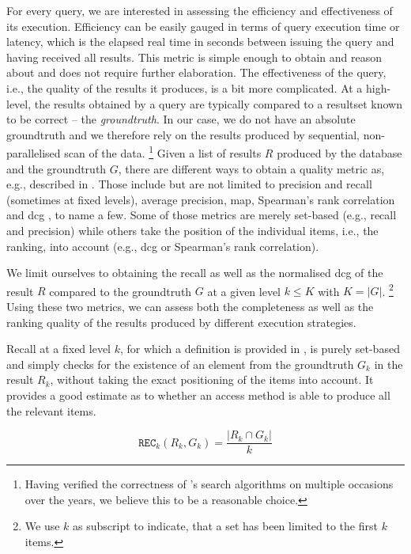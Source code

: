 For every query, we are interested in assessing the efficiency and effectiveness of its execution. Efficiency can be easily gauged in terms of query execution time or latency, which is the elapsed real time in seconds between issuing the query and having received all results. This metric is simple enough to obtain and reason about and does not require further elaboration. The effectiveness of the query, i.e., the quality of the results it produces, is a bit more complicated. At a high-level, the results obtained by a query are typically compared to a resultset known to be correct -- the \emph{groundtruth}. In our case, we do not have an absolute groundtruth and we therefore rely on the results produced by sequential, non-parallelised scan of the data. \footnote{Having verified the correctness of \cottontail{}'s search algorithms on multiple occasions over the years, we believe this to be a reasonable choice.} Given a list of results $R$ produced by the database and the groundtruth $G$, there are different ways to obtain a quality metric as, e.g., described in \cite{Webber:2010Similarity}. Those include but are not limited to precision and recall (sometimes at fixed levels), average precision, \acrfull{map}, Spearman's rank correlation and \acrfull{dcg} \cite{Jarvelin:2002Cumulated}, to name a few. Some of those metrics are merely set-based (e.g., recall and precision) while others take the position of the individual items, i.e., the ranking, into account (e.g., \acrshort{dcg} or Spearman's rank correlation).

We limit ourselves to obtaining the recall as well as the normalised \acrshort{dcg} \cite{Jarvelin:2002Cumulated} of the result $R$ compared to the groundtruth $G$ at a given level $k \leq K$ with $K = |G|$. \footnote{We use $k$ as subscript to indicate, that a set has been limited to the first $k$ items.} Using these two metrics, we can assess both the completeness as well as the ranking quality of the results produced by different execution strategies.

Recall at a fixed level $k$, for which a definition is provided in , is purely set-based and simply checks for the existence of an element from the groundtruth $G_k$ in the result $R_k$, without taking the exact positioning of the items into account. It provides a good estimate as to whether an access method is able to produce all the relevant items.

\begin{equation}
    \label{equation:recall}
    \texttt{REC}_k (R_k, G_k) = \frac{|R_k \cap G_k |}{k}
\end{equation}

